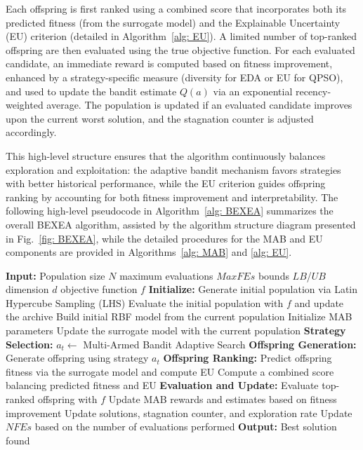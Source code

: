 \documentclass[review]{elsarticle}
\newcommand{\Indent}{\State\hspace{\algorithmicindent}}
\begin{document}
Each offspring is first ranked using a combined score that incorporates both its predicted fitness (from the surrogate model) and the Explainable Uncertainty (EU) criterion (detailed in Algorithm~\ref{alg: EU}). A limited number of top-ranked offspring are then evaluated using the true objective function. For each evaluated candidate, an immediate reward is computed based on fitness improvement, enhanced by a strategy-specific measure (diversity for EDA or EU for QPSO), and used to update the bandit estimate $Q(a)$ via an exponential recency-weighted average. The population is updated if an evaluated candidate improves upon the current worst solution, and the stagnation counter is adjusted accordingly.

This high-level structure ensures that the algorithm continuously balances exploration and exploitation: the adaptive bandit mechanism favors strategies with better historical performance, while the EU criterion guides offspring ranking by accounting for both fitness improvement and interpretability. The following high-level pseudocode in Algorithm~\ref{alg: BEXEA} summarizes the overall BEXEA algorithm, assisted by the algorithm structure diagram presented in Fig.~\ref{fig: BEXEA}, while the detailed procedures for the MAB and EU components are provided in Algorithms~\ref{alg: MAB} and \ref{alg: EU}.

\begin{algorithm}
\caption{BEXEA: Algorithm Structure}\label{alg: BEXEA}
\begin{algorithmic}[1]
    \State \textbf{Input:} 
    \Indent Population size $N$
    \Indent maximum evaluations $MaxFEs$
    \Indent bounds $LB$/$UB$
    \Indent dimension $d$
    \Indent objective function $f$
    \State \textbf{Initialize:} 
    \Indent Generate initial population via Latin Hypercube Sampling (LHS)
    \Indent Evaluate the initial population with $f$ and update the archive
    \Indent Build initial RBF model from the current population
    \Indent Initialize MAB parameters
        \State Update the surrogate model with the current population
        \State \textbf{Strategy Selection:} 
        \Indent $a_t \gets$ Multi-Armed Bandit Adaptive Search
        \State \textbf{Offspring Generation:} 
        \Indent Generate offspring using strategy $a_t$
        \State \textbf{Offspring Ranking:} 
        \Indent Predict offspring fitness via the surrogate model and compute EU
        \Indent Compute a combined score balancing predicted fitness and EU
        \State \textbf{Evaluation and Update:} 
        \Indent Evaluate top-ranked offspring with $f$
        \Indent Update MAB rewards and estimates based on fitness improvement
        \Indent Update solutions, stagnation counter, and exploration rate
        \Indent Update $NFEs$ based on the number of evaluations performed
    \EndWhile
    \State \textbf{Output:} Best solution found
\end{algorithmic}
\end{algorithm}
\end{document}
